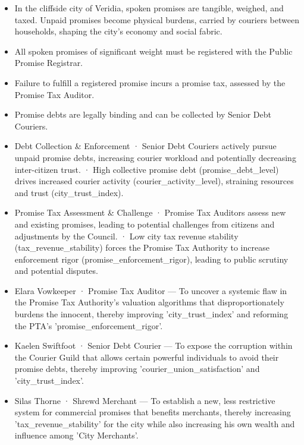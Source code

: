 \documentclass[10pt,a4paper]{article}
\newcommand{\heading}[1]{\par\vspace{5pt}{\color{teal}\bfseries #1}\par}
\begin{document}
\begin{minipage}[t]{0.48\linewidth}\fontsize{9}{12}\selectfont\raggedright\setlength{\parskip}{0pt}
\heading{世界概述}\begin{itemize}
\item In the cliffside city of Veridia, spoken promises are tangible, weighed, and taxed. Unpaid promises become physical burdens, carried by couriers between households, shaping the city's economy and social fabric.
\end{itemize}
\heading{规则与制度}\begin{itemize}
\item All spoken promises of significant weight must be registered with the Public Promise Registrar.
\item Failure to fulfill a registered promise incurs a promise tax, assessed by the Promise Tax Auditor.
\item Promise debts are legally binding and can be collected by Senior Debt Couriers.
\end{itemize}
\heading{活动与压力}\begin{itemize}
\item Debt Collection \& Enforcement · Senior Debt Couriers actively pursue unpaid promise debts, increasing courier workload and potentially decreasing inter-citizen trust. · High collective promise debt (promise\_debt\_level) drives increased courier activity (courier\_activity\_level), straining resources and trust (city\_trust\_index).
\item Promise Tax Assessment \& Challenge · Promise Tax Auditors assess new and existing promises, leading to potential challenges from citizens and adjustments by the Council. · Low city tax revenue stability (tax\_revenue\_stability) forces the Promise Tax Authority to increase enforcement rigor (promise\_enforcement\_rigor), leading to public scrutiny and potential disputes.
\end{itemize}
\heading{人物与目标}\begin{itemize}
\item Elara Vowkeeper · Promise Tax Auditor — To uncover a systemic flaw in the Promise Tax Authority's valuation algorithms that disproportionately burdens the innocent, thereby improving 'city\_trust\_index' and reforming the PTA's 'promise\_enforcement\_rigor'.
\item Kaelen Swiftfoot · Senior Debt Courier — To expose the corruption within the Courier Guild that allows certain powerful individuals to avoid their promise debts, thereby improving 'courier\_union\_satisfaction' and 'city\_trust\_index'.
\item Silas Thorne · Shrewd Merchant — To establish a new, less restrictive system for commercial promises that benefits merchants, thereby increasing 'tax\_revenue\_stability' for the city while also increasing his own wealth and influence among 'City Merchants'.
\end{itemize}
\end{minipage}\hfill
\end{document}
